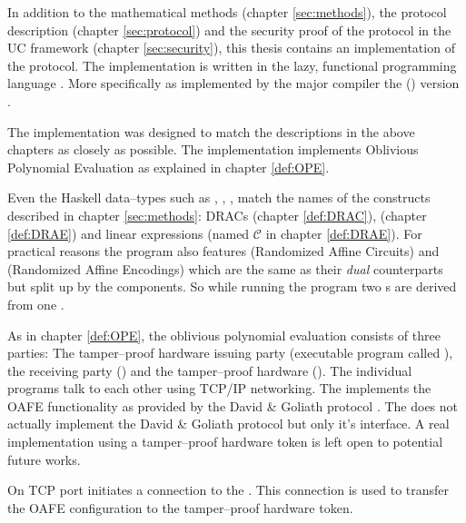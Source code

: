 \label{sec:implementation}

In addition to the mathematical methods (chapter \ref{sec:methods}), the
protocol description (chapter \ref{sec:protocol}) and the security proof of the
protocol in the UC framework (chapter \ref{sec:security}), this thesis contains
an implementation of the protocol. The implementation is written in the lazy,
functional programming language \JWTLhaskell{}. More specifically \JWThaskell{}
as implemented by the major \JWThaskell{} compiler the \JWTXLghc{} (\JWTghc{})
version \JWTVghc{}.

The implementation was designed to match the descriptions in the above chapters
as closely as possible. The implementation implements Oblivious Polynomial
Evaluation as explained in chapter \ref{def:OPE}.

Even the Haskell data--types such as , , ,
 match the names of the constructs described in chapter
\ref{sec:methods}: DRACs (chapter \ref{def:DRAC}), (chapter \ref{def:DRAE}) and
linear expressions (named $\mathcal{C}$ in chapter \ref{def:DRAE}). For
practical reasons the program also features  (Randomized Affine
Circuits) and  (Randomized Affine Encodings) which are the same as
their \emph{dual} counterparts but split up by the components. So while running
the program two s are derived from one .

As in chapter \ref{def:OPE}, the oblivious polynomial evaluation consists of
three parties: The tamper--proof hardware issuing party \JWpOne{} (executable
program called \JWBpOne{}), the receiving party \JWpTwo{} (\JWBpTwo{}) and the
tamper--proof hardware \JWtoken{} (\JWBtoken{}). The individual programs talk to
each other using TCP/IP networking. The \JWtoken{} implements the OAFE
functionality  as provided by the David \& Goliath
protocol \cite{davidgoliath}. The \JWtoken{} does not actually implement the
David \& Goliath protocol but only it's interface. A real implementation using a
tamper--proof hardware token is left open to potential future works.


%
%
\label{sec:communication-channels}


\label{sec:comm:goliath2Token}

On TCP port  \JWpOne{} initiates a connection to the \JWtoken{}.
This connection is used to transfer the OAFE configuration to the tamper--proof
hardware token.


